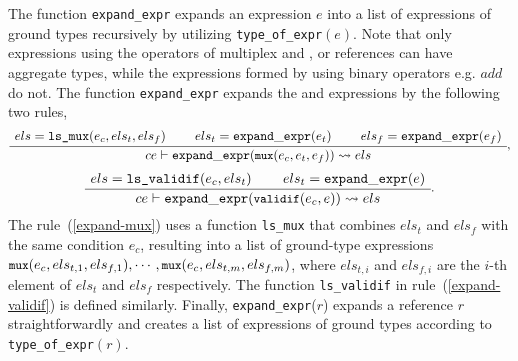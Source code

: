The function {\tt expand\_expr} expands an expression $e$ into a list of expressions of ground types recursively by utilizing {\tt type\_of\_expr}$(e)$. 
Note that only expressions using the operators of multiplex  and 
 , or references can have aggregate types, while the expressions formed by using binary operators e.g. $add$ do not. 
The function {\tt expand\_expr} expands the  and 
  expressions by the following two rules, 
  \begin{gather}
  \label{expand-mux}
    \inferiii[]
    {\seqq{ce\vdash{\tt expand\_expr} (\mbox{\prettyll{mux}}(e_c, e_t, e_f)) \rightsquigarrow els}}
    {\seqq{els = \mbox{\tt ls\_mux}(e_c, els_t, els_f)}} 
    {\seqq{els_t = {\tt expand\_expr}(e_t)}} 
    {\seqq{els_f = {\tt expand\_expr}(e_f)}},
    \end{gather}
  \begin{gather}
  \label{expand-validif}
    \inferii[]
    {\seqq{ce\vdash{\tt expand\_expr} (\mbox{\prettyll{validif}}(e_c, e)) \rightsquigarrow els}}
    {\seqq{els  = \mbox{\tt ls\_validif}(e_c, els_t)}} 
    {\seqq{els_t = {\tt expand\_expr}(e)}}.
    \end{gather}
The rule~(\ref{expand-mux}) uses a function {\tt ls\_mux} that combines $els_t$ and $els_f$ with the same condition $e_c$, resulting into a list of ground-type expressions $\mbox{\prettyll{mux}}(e_c,els_{t, 1}, els_{f, 1}), \cdots, \mbox{\prettyll{mux}}(e_c, els_{t, m}, els_{f, m})$, where  $els_{t,i}$ and $els_{f, i}$ are the $i$-th element of $els_t$ and $els_f$ respectively. The function {\tt ls\_validif} in rule~(\ref{expand-validif}) is defined similarly. 
%
%
Finally, {\tt expand\_expr}($r$) expands a reference $r$ straightforwardly and creates a list of expressions of ground types according to {\tt type\_of\_expr$(r)$}. 

